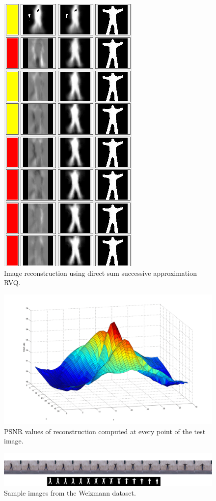 \documentclass{article}
\begin{document}
					\begin{figure}	
					\centering			
					\includegraphics[width=.25\textwidth]{figs/RVQ_HMM_IPCV2010_reconstruction_jack___moshe__00022___79x109}
					\caption{Image reconstruction using direct sum successive approximation RVQ.}
					\label{fig:reconstruction}
			\end{figure}	
			
								\begin{figure}				
					\includegraphics[width=.50\textwidth]{figs/RVQ_HMM_IPCV2010_reconstructionPSNRfromCORfile_jack___moshe__00022___79x109}
					\centering
					\caption{PSNR values of reconstruction computed at every point of the test image.}
					\label{fig:corFile}
			\end{figure}
			
								\begin{figure}		
								\centering		
					\includegraphics[width=1.0\textwidth]{figs/RVQ_HMM_IPCV2010_WeizmannSequenceSnapshot}
					\centering
					\caption{Sample images from the Weizmann dataset.}
					\label{fig:sequence}
			\end{figure}
			
\end{document}
